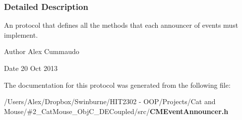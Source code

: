\subsubsection{Detailed Description}
An protocol that defines all the methods that each announcer of events must implement. 

\begin{DoxyAuthor}{Author}
Alex Cummaudo 
\end{DoxyAuthor}
\begin{DoxyDate}{Date}
20 Oct 2013 
\end{DoxyDate}


The documentation for this protocol was generated from the following file\-:\begin{DoxyCompactItemize}
\item 
/\-Users/\-Alex/\-Dropbox/\-Swinburne/\-H\-I\-T2302 -\/ O\-O\-P/\-Projects/\-Cat and Mouse/\#2\-\_\-\-Cat\-Mouse\-\_\-\-Obj\-C\-\_\-\-D\-E\-Coupled/src/{\bf C\-M\-Event\-Announcer.\-h}\end{DoxyCompactItemize}
